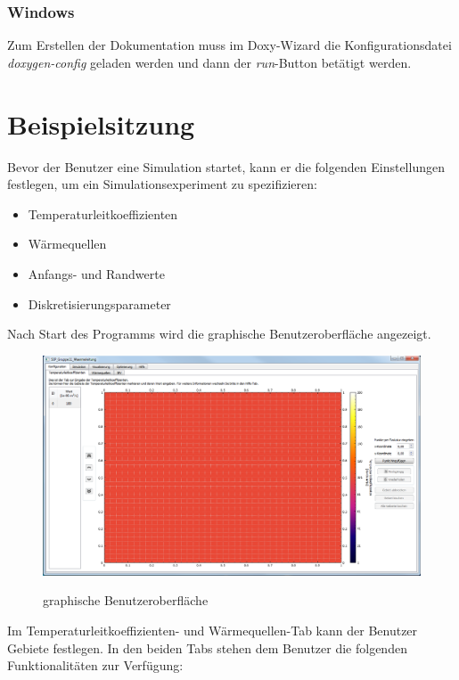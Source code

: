 \subsubsection{Windows}
Zum Erstellen der Dokumentation muss im Doxy-Wizard die Konfigurationsdatei \emph{doxygen-config} geladen werden und dann der \emph{run}-Button betätigt werden.

\newpage
\section{Beispielsitzung}

Bevor der Benutzer eine Simulation startet, kann er die folgenden Einstellungen festlegen, um ein Simulationsexperiment zu spezifizieren:
\begin{itemize}
\item Temperaturleitkoeffizienten
\item Wärmequellen
\item Anfangs- und Randwerte
\item Diskretisierungsparameter
\end{itemize}
\noindent
Nach Start des Programms wird die graphische Benutzeroberfläche angezeigt.
\begin{figure}[H]
\centering
\includegraphics[scale=.5]{Bilder/StartAnzeige.png}\\
\caption{graphische Benutzeroberfläche}
\label{graphische Benutzeroberfläche}
\end{figure}

\newpage
\noindent
Im Temperaturleitkoeffizienten- und Wärmequellen-Tab kann der Benutzer Gebiete festlegen. In den beiden Tabs stehen dem Benutzer die folgenden Funktionalitäten zur Verfügung:\\


